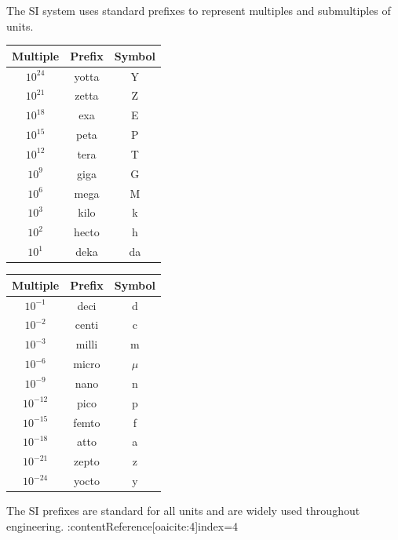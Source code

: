 \documentclass[12pt]{article}
\begin{document}
The SI system uses standard prefixes to represent multiples and submultiples of units.
\begin{center}

\begin{tabular}{|c|c|c|}
    \hline
    \textbf{Multiple} & \textbf{Prefix} & \textbf{Symbol} \\
    \hline
    \(10^{24}\) & yotta & Y \\
    \hline
    \(10^{21}\) & zetta & Z \\
    \hline
    \(10^{18}\) & exa & E \\
    \hline
    \(10^{15}\) & peta & P \\
    \hline
    \(10^{12}\) & tera & T \\
    \hline
    \(10^{9}\) & giga & G \\
    \hline
    \(10^{6}\) & mega & M \\
    \hline
    \(10^{3}\) & kilo & k \\
    \hline
    \(10^{2}\) & hecto & h \\
    \hline
    \(10^{1}\) & deka & da \\
    \hline
\end{tabular}
\qquad
\begin{tabular}{|c|c|c|}
    \hline
    \textbf{Multiple} & \textbf{Prefix} & \textbf{Symbol} \\
    \hline
    \(10^{-1}\) & deci & d \\
    \hline
    \(10^{-2}\) & centi & c \\
    \hline
    \(10^{-3}\) & milli & m \\
    \hline
    \(10^{-6}\) & micro & \(\mu\) \\
    \hline
    \(10^{-9}\) & nano & n \\
    \hline
    \(10^{-12}\) & pico & p \\
    \hline
    \(10^{-15}\) & femto & f \\
    \hline
    \(10^{-18}\) & atto & a \\
    \hline
    \(10^{-21}\) & zepto & z \\
    \hline
    \(10^{-24}\) & yocto & y \\
    \hline
\end{tabular}

\end{center}

The SI prefixes are standard for all units and are widely used throughout engineering. :contentReference[oaicite:4]{index=4}
\end{document}
